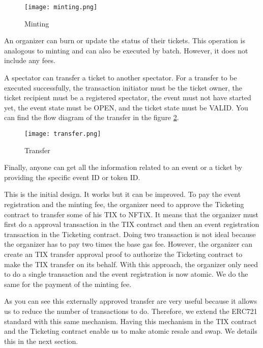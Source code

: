 \documentclass[a4paper,11pt,oneside]{report}
\begin{document}
\begin{figure}[h!]
  \texttt{[image: minting.png]}
  \caption{Minting}
  \label{fig:minting}
\end{figure}

An organizer can burn or update the status of their tickets. This operation is analogous to minting and can also be executed by batch. However, it does not include any fees.

A spectator can transfer a ticket to another spectator. For a transfer to be executed successfully, the transaction initiator must be the ticket owner, the ticket recipient must be a registered spectator, the event must not have started yet, the event state must be OPEN, and the ticket state must be VALID. You can find the flow diagram of the transfer in the figure \hyperref[fig:transfer]{\ref{fig:transfer}}.

\begin{figure}[h!]
  \centering
  \texttt{[image: transfer.png]}
  \caption{Transfer}
  \label{fig:transfer}
\end{figure}

Finally, anyone can get all the information related to an event or a ticket by providing the specific event ID or token ID.

This is the initial design. It works but it can be improved. To pay the event registration and the minting fee, the organizer need to approve the Ticketing contract to transfer some of his TIX to NFTiX. It means that the organizer must first do a approval transaction in the TIX contract and then an event registration transaction in the Ticketing contract. Doing two transaction is not ideal because the organizer has to pay two times the base gas fee. However, the organizer can create an TIX transfer approval proof to authorize the Ticketing contract to make the TIX transfer on its behalf. With this approach, the organizer only need to do a single transaction and the event registration is now atomic. We do the same for the payment of the minting fee.

As you can see this externally approved transfer are very useful because it allows us to reduce the number of transactions to do. Therefore, we extend the ERC721 standard with this same mechanism. Having this mechanism in the TIX contract and the Ticketing contract enable us to make atomic resale and swap. We details this in the next section.
\end{document}
